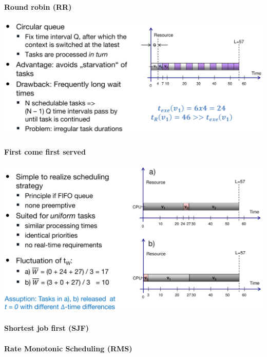 \documentclass[english]{latex4ei/latex4ei_sheet}
\begin{document}
\paragraph{Round robin (RR)}

\begin{center}
  \centering
  \includegraphics[width=\linewidth]{assets/RoundRobin.png}
  \label{fig:roundrobin}
\end{center}


\paragraph{First come first served}
\begin{center}
  \centering
  \includegraphics[width=\linewidth]{assets/FistComeFirstServed.png}
  \label{fig:fistcomefirstserved}
\end{center}
 
\paragraph{Shortest job first (SJF)}

\paragraph{Rate Monotonic Scheduling (RMS)}
\end{document}
